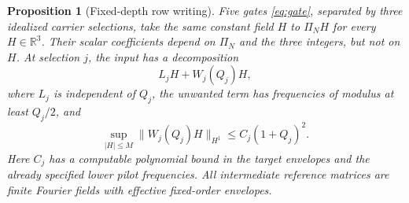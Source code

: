 \documentclass[11pt,a4paper]{amsart}
\newtheorem{proposition}[theorem]{Proposition}
\theoremstyle{definition}
\theoremstyle{remark}
\numberwithin{equation}{section}
\newcommand{\R}{\mathbb R}
\newcommand{\norm}[1]{\lVert #1\rVert}
\begin{document}
\begin{proposition}[Fixed-depth row writing]\label{prop:algebra}
Five gates \eqref{eq:gate}, separated by three idealized carrier selections,
take the same constant field $H$ to $\Pi_NH$ for every $H\in\R^3$.
Their scalar coefficients depend on $\Pi_N$ and the three integers, but
not on $H$. At selection $j$, the input has a decomposition
\begin{equation}\label{eq:lowhigh}
 L_jH+W_j(Q_j)H,
\end{equation}
where $L_j$ is independent of $Q_j$, the unwanted term has frequencies of
modulus at least $Q_j/2$, and
\begin{equation}\label{eq:carrierbound}
 \sup_{|H|\le M}\norm{W_j(Q_j)H}_{H^1}
       \le C_j(1+Q_j)^2.
\end{equation}
Here $C_j$ has a computable polynomial bound in the target envelopes and
the already specified lower pilot frequencies. All intermediate reference
matrices are finite Fourier fields with effective fixed-order envelopes.
\end{proposition}
\end{document}
